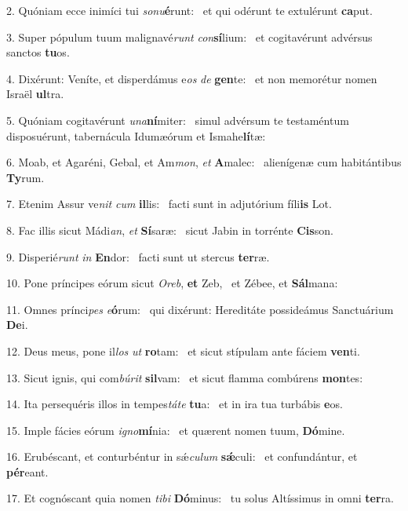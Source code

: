 2. Quóniam ecce inimíci tui \textit{so}\textit{nu}\textbf{é}runt: \ast\  et qui odérunt te extulérunt \textbf{ca}put.\

3. Super pópulum tuum malignavé\textit{runt} \textit{con}\textbf{sí}lium: \ast\  et cogitavérunt advérsus sanctos \textbf{tu}os.\

4. Dixérunt: Veníte, et disperdámus e\textit{os} \textit{de} \textbf{gen}te: \ast\  et non memorétur nomen Israël \textbf{ul}tra.\

5. Quóniam cogitavérunt \textit{u}\textit{na}\textbf{ní}miter: \ast\  simul advérsum te testaméntum disposuérunt, tabernácula Idumæórum et Ismahe\textbf{lí}tæ:\

6. Moab, et Agaréni, Gebal, et Am\textit{mon}, \textit{et} \textbf{A}malec: \ast\  alienígenæ cum habitántibus \textbf{Ty}rum.\

7. Etenim Assur ve\textit{nit} \textit{cum} \textbf{il}lis: \ast\  facti sunt in adjutórium fíli\textbf{is} Lot.\

8. Fac illis sicut Mádi\textit{an}, \textit{et} \textbf{Sí}saræ: \ast\  sicut Jabin in torrénte \textbf{Cis}son.\

9. Disperié\textit{runt} \textit{in} \textbf{En}dor: \ast\  facti sunt ut stercus \textbf{ter}ræ.\

10. Pone príncipes eórum sicut \textit{O}\textit{reb}, \textbf{et} Zeb, \ast\  et Zébee, et \textbf{Sál}mana:\

11. Omnes prínci\textit{pes} \textit{e}\textbf{ó}rum: \ast\  qui dixérunt: Hereditáte possideámus Sanctuárium \textbf{De}i.\

12. Deus meus, pone il\textit{los} \textit{ut} \textbf{ro}tam: \ast\  et sicut stípulam ante fáciem \textbf{ven}ti.\

13. Sicut ignis, qui com\textit{bú}\textit{rit} \textbf{sil}vam: \ast\  et sicut flamma combúrens \textbf{mon}tes:\

14. Ita persequéris illos in tempes\textit{tá}\textit{te} \textbf{tu}a: \ast\  et in ira tua turbábis \textbf{e}os.\

15. Imple fácies eórum \textit{i}\textit{gno}\textbf{mí}nia: \ast\  et quærent nomen tuum, \textbf{Dó}mine.\

16. Erubéscant, et conturbéntur in sǽ\textit{cu}\textit{lum} \textbf{sǽ}culi: \ast\  et confundántur, et \textbf{pér}eant.\

17. Et cognóscant quia nomen \textit{ti}\textit{bi} \textbf{Dó}minus: \ast\  tu solus Altíssimus in omni \textbf{ter}ra.\

